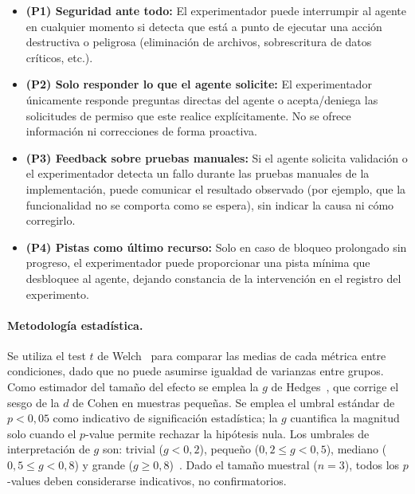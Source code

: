 \documentclass[11pt, letterpaper]{article}
\begin{document}
\begin{itemize}
    \item \textbf{(P1) Seguridad ante todo:} El experimentador puede
    interrumpir al agente en cualquier momento si detecta que está
    a punto de ejecutar una acción destructiva o peligrosa
    (eliminación de archivos, sobrescritura de datos críticos, etc.).

    \item \textbf{(P2) Solo responder lo que el agente solicite:}
    El experimentador únicamente responde preguntas directas del
    agente o acepta/deniega las solicitudes de permiso que este
    realice explícitamente. No se ofrece información ni correcciones
    de forma proactiva.

    \item \textbf{(P3) Feedback sobre pruebas manuales:} Si el
    agente solicita validación o el experimentador detecta un fallo
    durante las pruebas manuales de la implementación, puede
    comunicar el resultado observado (por ejemplo, que la
    funcionalidad no se comporta como se espera), sin indicar la
    causa ni cómo corregirlo.

    \item \textbf{(P4) Pistas como último recurso:} Solo en caso
    de bloqueo prolongado sin progreso, el experimentador puede
    proporcionar una pista mínima que desbloquee al agente, dejando
    constancia de la intervención en el registro del experimento.
\end{itemize}

\paragraph{Metodología estadística.}
Se utiliza el test $t$ de Welch~\cite{welch1947} para comparar las medias de cada métrica entre condiciones, dado que no puede asumirse igualdad de varianzas entre grupos. Como estimador del tamaño del efecto se emplea la $g$ de Hedges~\cite{Hedges}, que corrige el sesgo de la $d$ de Cohen en muestras pequeñas. Se emplea el umbral estándar de $p < 0{,}05$ como indicativo de significación estadística; la $g$ cuantifica la magnitud solo cuando el $p$-value permite rechazar la hipótesis nula. Los umbrales de interpretación de $g$ son: trivial ($g < 0{,}2$), pequeño ($0{,}2 \leq g < 0{,}5$), mediano ($0{,}5 \leq g < 0{,}8$) y grande ($g \geq 0{,}8$)~\cite{cohen1988statistical}. Dado el tamaño muestral ($n=3$), todos los $p$-values deben considerarse indicativos, no confirmatorios.
\end{document}
